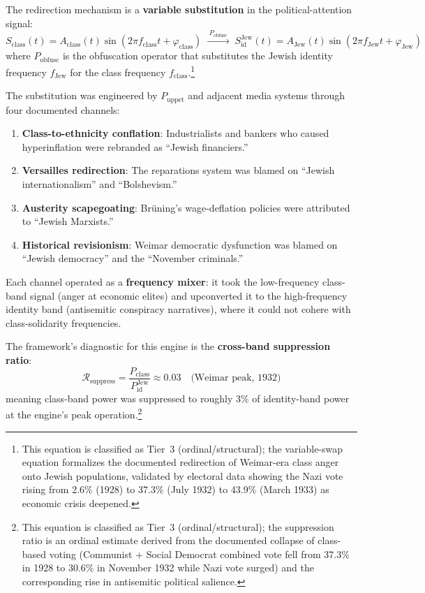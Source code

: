 The redirection mechanism is a \textbf{variable substitution} in the political-attention signal:
\begin{equation}\label{eq:10.antisemitism-variable-swap}
S_{\text{class}}(t) = A_{\text{class}}(t)\sin(2\pi f_{\text{class}} t + \varphi_{\text{class}}) \;\xrightarrow{\;P_{\text{obfusc}}\;}\; S_{\text{id}}^{\text{Jew}}(t) = A_{\text{Jew}}(t)\sin(2\pi f_{\text{Jew}} t + \varphi_{\text{Jew}})
\end{equation}
where $P_{\text{obfusc}}$ is the obfuscation operator that substitutes the Jewish identity frequency $f_{\text{Jew}}$ for the class frequency $f_{\text{class}}$.\footnote{This equation is classified as Tier~3 (ordinal/structural); the variable-swap equation formalizes the documented redirection of Weimar-era class anger onto Jewish populations, validated by electoral data showing the Nazi vote rising from 2.6\% (1928) to 37.3\% (July 1932) to 43.9\% (March 1933) as economic crisis deepened.}

The substitution was engineered by $P_{\text{uppet}}$ and adjacent media systems through four documented channels:
\begin{enumerate}
    \item \textbf{Class-to-ethnicity conflation}: Industrialists and bankers who caused hyperinflation were rebranded as ``Jewish financiers.''
    \item \textbf{Versailles redirection}: The reparations system was blamed on ``Jewish internationalism'' and ``Bolshevism.''
    \item \textbf{Austerity scapegoating}: Br\"uning's wage-deflation policies were attributed to ``Jewish Marxists.''
    \item \textbf{Historical revisionism}: Weimar democratic dysfunction was blamed on ``Jewish democracy'' and the ``November criminals.''
\end{enumerate}

Each channel operated as a \textbf{frequency mixer}: it took the low-frequency class-band signal (anger at economic elites) and upconverted it to the high-frequency identity band (antisemitic conspiracy narratives), where it could not cohere with class-solidarity frequencies.

The framework's diagnostic for this engine is the \textbf{cross-band suppression ratio}:
\begin{equation}\label{eq:10.cross-band-suppression}
\mathcal{R}_{\text{suppress}} = \frac{P_{\text{class}}}{P_{\text{id}}^{\text{Jew}}} \approx 0.03 \quad \text{(Weimar peak, 1932)}
\end{equation}
meaning class-band power was suppressed to roughly 3\% of identity-band power at the engine's peak operation.\footnote{This equation is classified as Tier~3 (ordinal/structural); the suppression ratio is an ordinal estimate derived from the documented collapse of class-based voting (Communist + Social Democrat combined vote fell from 37.3\% in 1928 to 30.6\% in November 1932 while Nazi vote surged) and the corresponding rise in antisemitic political salience.}

